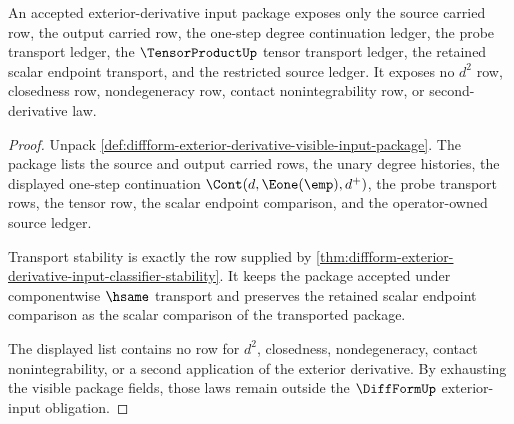 \begin{theorem}
\label{thm:diffform-downstream-exterior-input-obligation}
An accepted exterior-derivative input package exposes only the source carried
row, the output carried row, the one-step degree continuation ledger, the
probe transport ledger, the $\TensorProductUp$ tensor transport ledger, the
retained scalar endpoint transport, and the restricted source ledger. It
exposes no $d^2$ row, closedness row, nondegeneracy row, contact
nonintegrability row, or second-derivative law.
\end{theorem}
\begin{proof}
Unpack
\autoref{def:diffform-exterior-derivative-visible-input-package}. The package
lists the source and output carried rows, the unary degree histories, the
displayed one-step continuation $\Cont(d,\Eone(\emp),d^+)$, the probe
transport rows, the tensor row, the scalar endpoint comparison, and the
operator-owned source ledger.

Transport stability is exactly the row supplied by
\autoref{thm:diffform-exterior-derivative-input-classifier-stability}. It
keeps the package accepted under componentwise $\hsame$ transport and
preserves the retained scalar endpoint comparison as the scalar comparison of
the transported package.

The displayed list contains no row for $d^2$, closedness, nondegeneracy,
contact nonintegrability, or a second application of the exterior derivative.
By exhausting the visible package fields, those laws remain outside the
$\DiffFormUp$ exterior-input obligation.
\end{proof}

